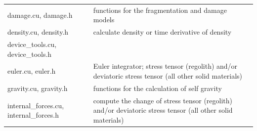\documentclass[10pt,fleqn,twoside]{article}
\begin{document}
\begin{table}
\begin{tabular}[b]{p{6cm} p{9cm}}
  damage.cu, damage.h                                           & functions for the fragmentation and damage models                                                                                                                                                                                                                                                                                                          \\
  density.cu, density.h                                         & calculate density or time derivative of density                                                                                                                                                                                                                                                                                                            \\
  device\_tools.cu, device\_tools.h                             &                                                                                                                                                                                                                                                                                                                                                            \\
  euler.cu, euler.h                                             & Euler integrator; stress tensor (regolith) and/or deviatoric stress tensor (all other solid materials)                                                                                                                                                                                                                                                     \\
  gravity.cu, gravity.h                                         & functions for the calculation of self gravity                                                                                                                                                                                                                                                                                                              \\
  internal\_forces.cu, internal\_forces.h                       & compute the change of stress tensor (regolith) and/or deviatoric stress tensor (all other solid materials)                                                                                                                                                                                                                                                 \\

\end{tabular}
\end{table}
\end{document}

